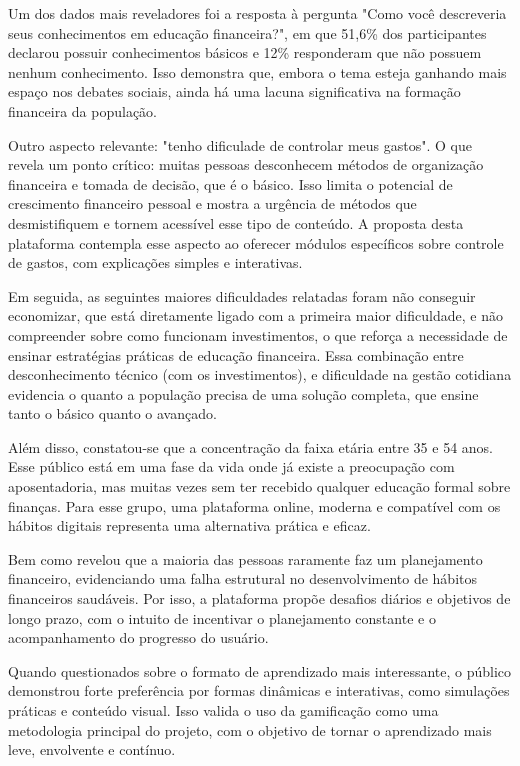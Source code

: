 \documentclass[
	article,			%
	12pt,				%
	oneside,			%
	a4paper,			%
	english,			%
	brazil,				%
	sumario=tradicional
	]{abntex2}
\begin{document}
    Um dos dados mais reveladores foi a resposta à pergunta "Como você descreveria seus conhecimentos em educação financeira?", em que 51,6\% dos participantes declarou possuir conhecimentos básicos e 12\% responderam que não possuem nenhum conhecimento. Isso demonstra que, embora o tema esteja ganhando mais espaço nos debates sociais, ainda há uma lacuna significativa na formação financeira da população.

    Outro aspecto relevante: "tenho dificulade de controlar meus gastos". O que revela um ponto crítico: muitas pessoas desconhecem métodos de organização financeira e tomada de decisão, que é o básico. Isso limita o potencial de crescimento financeiro pessoal e mostra a urgência de métodos que desmistifiquem e tornem acessível esse tipo de conteúdo. A proposta desta plataforma contempla esse aspecto ao oferecer módulos específicos sobre controle de gastos, com explicações simples e interativas.

    Em seguida, as seguintes maiores dificuldades relatadas foram não conseguir economizar, que está diretamente ligado com a primeira maior dificuldade, e não compreender sobre como funcionam investimentos, o que reforça a necessidade de ensinar estratégias práticas de educação financeira. Essa combinação entre desconhecimento técnico (com os investimentos), e dificuldade na gestão cotidiana evidencia o quanto a população precisa de uma solução completa, que ensine tanto o básico quanto o avançado.

    Além disso, constatou-se que a concentração da faixa etária entre 35 e 54 anos. Esse público está em uma fase da vida onde já existe a preocupação com aposentadoria, mas muitas vezes sem ter recebido qualquer educação formal sobre finanças. Para esse grupo, uma plataforma online, moderna e compatível com os hábitos digitais representa uma alternativa prática e eficaz.

    Bem como revelou que a maioria das pessoas raramente faz um planejamento financeiro, evidenciando uma falha estrutural no desenvolvimento de hábitos financeiros saudáveis. Por isso, a plataforma propõe desafios diários e objetivos de longo prazo, com o intuito de incentivar o planejamento constante e o acompanhamento do progresso do usuário.

    Quando questionados sobre o formato de aprendizado mais interessante, o público demonstrou forte preferência por formas dinâmicas e interativas, como simulações práticas e conteúdo visual. Isso valida o uso da gamificação como uma metodologia principal do projeto, com o objetivo de tornar o aprendizado mais leve, envolvente e contínuo.
\end{document}
